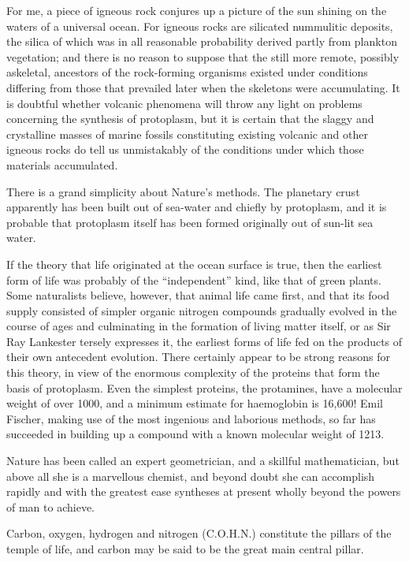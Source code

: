 \documentclass[a4paper, 12pt, oneside]{article}
\begin{document}
For me, a piece of igneous rock conjures up a picture of the sun shining on the waters of a universal ocean. For igneous rocks are silicated nummulitic deposits, the silica of which was in all reasonable probability derived partly from plankton vegetation; and there is no reason to suppose that the still more remote, possibly askeletal, ancestors of the rock-forming organisms existed under conditions differing from those that prevailed later when the skeletons were accumulating. It is doubtful whether volcanic phenomena will throw any light on problems concerning the synthesis of protoplasm, but it is certain that the slaggy and crystalline masses of marine fossils constituting existing volcanic and other igneous rocks do tell us unmistakably of the conditions under which those materials accumulated.

There is a grand simplicity about Nature's methods. The planetary crust apparently has been built out of sea-water and chiefly by protoplasm, and it is probable that protoplasm itself has been formed originally out of sun-lit sea water.

If the theory that life originated at the ocean surface is true, then the earliest form of life was probably of the ``independent'' kind, like that of green plants. Some naturalists believe, however, that animal life came first, and that its food supply consisted of simpler organic nitrogen compounds gradually evolved in the course of ages and culminating in the formation of living matter itself, or as Sir Ray Lankester tersely expresses it, the earliest forms of life fed on the products of their own antecedent evolution. There certainly appear to be strong reasons for this theory, in view of the enormous complexity of the proteins that form the basis of protoplasm. Even the simplest proteins, the protamines, have a molecular weight of over 1000, and a minimum estimate for haemoglobin is 16,600! Emil Fischer, making use of the most ingenious and laborious methods, so far has succeeded in building up a compound with a known molecular weight of 1213.

Nature has been called an expert geometrician, and a skillful mathematician, but above all she is a marvellous chemist, and beyond doubt she can accomplish rapidly and with the greatest ease syntheses at present wholly beyond the powers of man to achieve.

Carbon, oxygen, hydrogen and nitrogen (C.O.H.N.) constitute the pillars of the temple of life, and carbon may be said to be the great main central pillar.
\end{document}
